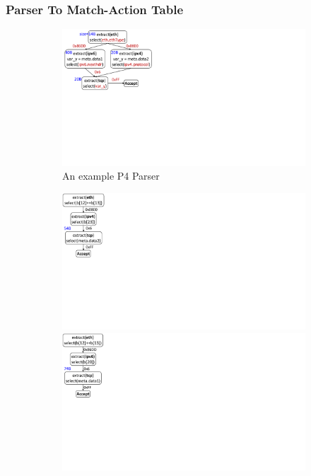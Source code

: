 \documentclass[letterpaper,twocolumn,10pt]{article}
\begin{document}
\subsubsection{Parser To Match-Action Table}
\label{subsection:parser-to-match-action-table}
\begin{figure}[!ht]
    \begin{subfigure}[b]{0.25\linewidth}
        \centering
        \includegraphics[trim=4 270 596 0, clip,scale=0.37]{parser-transformation-example}    
        \caption{An example P4 Parser}
        \label{subfig:parser}
    \end{subfigure}
    \begin{subfigure}[b]{0.26\linewidth}
        \centering
        \includegraphics[trim=0 285 794 0, clip,scale=0.37]{parser-example-se-1}
        \includegraphics[trim=0 285 794 0, clip,scale=0.37]{parser-example-se-2}

\end{subfigure}
\end{figure}
\end{document}
